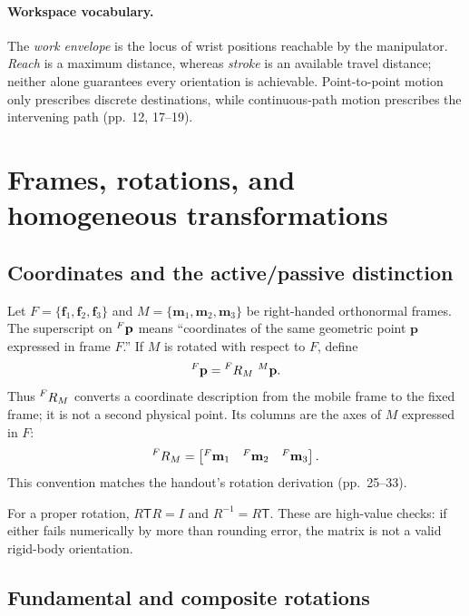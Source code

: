 \documentclass[11pt,a4paper]{article}
\newcommand{\trans}{\mathsf{T}}
\begin{document}
\paragraph{Workspace vocabulary.} The \emph{work envelope} is the locus of wrist positions reachable by the manipulator. \emph{Reach} is a maximum distance, whereas \emph{stroke} is an available travel distance; neither alone guarantees every orientation is achievable. Point-to-point motion only prescribes discrete destinations, while continuous-path motion prescribes the intervening path (pp.~12, 17--19).

\section{Frames, rotations, and homogeneous transformations}

\subsection{Coordinates and the active/passive distinction}

Let $F=\{\mathbf f_1,\mathbf f_2,\mathbf f_3\}$ and $M=\{\mathbf m_1,\mathbf m_2,\mathbf m_3\}$ be right-handed orthonormal frames. The superscript on $\prescript{F}{}{\mathbf p}$ means ``coordinates of the same geometric point $\mathbf p$ expressed in frame $F$.'' If $M$ is rotated with respect to $F$, define
\[
  \prescript{F}{}{\mathbf p} = \prescript{F}{}{R}_{M}\,\prescript{M}{}{\mathbf p}.
\]
Thus $\prescript{F}{}{R}_{M}$ converts a coordinate description from the mobile frame to the fixed frame; it is not a second physical point. Its columns are the axes of $M$ expressed in $F$:
\[
  \prescript{F}{}{R}_{M} =
  \begin{bmatrix}
    \prescript{F}{}{\mathbf m}_1 & \prescript{F}{}{\mathbf m}_2 & \prescript{F}{}{\mathbf m}_3
  \end{bmatrix}.
\]
This convention matches the handout's rotation derivation (pp.~25--33).

For a proper rotation, $R\trans R=I$ and $R^{-1}=R\trans$. These are high-value checks: if either fails numerically by more than rounding error, the matrix is not a valid rigid-body orientation.

\subsection{Fundamental and composite rotations}
\end{document}
